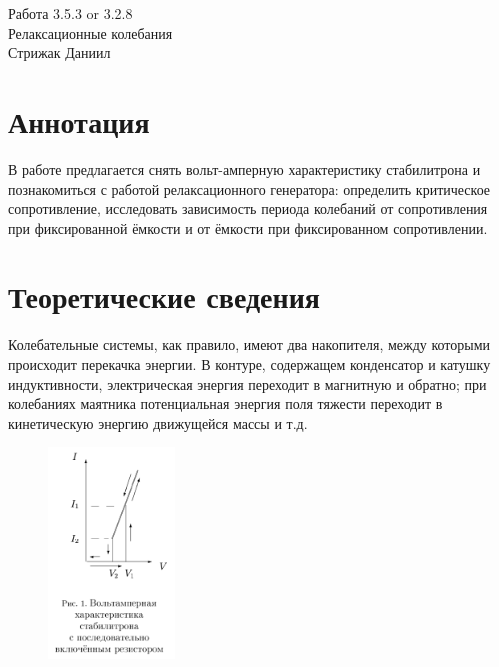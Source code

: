 



\begin{center}
  \LARGE{Работа 3.5.3 or 3.2.8}\\[0.2cm]
  \LARGE{Релаксационные колебания}\\[0.2cm]
  \large{Стрижак Даниил}\\[0.2cm]
\end{center}  
  

\section{Аннотация}

В работе предлагается снять вольт-амперную характеристику стабилитрона и познакомиться с работой релаксационного генератора: определить критическое сопротивление, исследовать зависимость периода колебаний от сопротивления при фиксированной ёмкости и от ёмкости при фиксированном сопротивлении.

\section{Теоретические сведения}

 Колебательные системы, как правило, имеют два накопителя, между которыми происходит перекачка энергии. В контуре, содержащем конденсатор и катушку индуктивности, электрическая энергия переходит в магнитную и обратно; при колебаниях маятника потенциальная энергия поля тяжести переходит в кинетическую энергию движущейся массы и т.д. 

\begin{figure} 
\begin{center}
\includegraphics[width=0.3\textwidth]{1.PNG} 
\end{center}
\end{figure}

